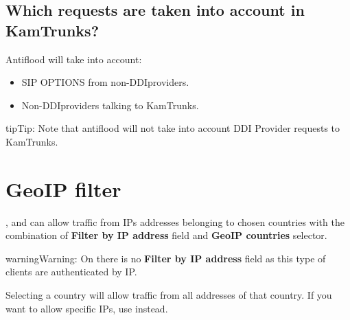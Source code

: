 \documentclass[letterpaper,10pt,english]{sphinxmanual}
\begin{document}
\subsection{Which requests are taken into account in KamTrunks?}
\label{security_and_maintenance/security/antiflooding:which-requests-are-taken-into-account-in-kamtrunks}
Antiflood will take into account:
\begin{itemize}
\item {} 
SIP OPTIONS from non-DDIproviders.

\item {} 
Non-DDIproviders talking to KamTrunks.

\end{itemize}

\begin{notice}{tip}{Tip:}
Note that antiflood will not take into account DDI Provider requests to KamTrunks.
\end{notice}


\section{GeoIP filter}
\label{security_and_maintenance/security/geoip_filter:geoip-filter}\label{security_and_maintenance/security/geoip_filter::doc}\label{security_and_maintenance/security/geoip_filter:id1}
{\hyperref[administration_portal/client/vpbx/index:vpbx\string-clients]{}}, {\hyperref[administration_portal/client/retail/index:retail\string-clients]{}} and {\hyperref[administration_portal/client/residential/index:residential\string-clients]{}} can allow traffic from
IPs addresses belonging to chosen countries with the combination of \textbf{Filter by IP address} field and \textbf{GeoIP countries} selector.

\begin{notice}{warning}{Warning:}
On {\hyperref[administration_portal/client/wholesale/index:wholesale\string-clients]{}} there is no \textbf{Filter by IP address} field as this type of clients are authenticated by IP.
\end{notice}

Selecting a country will allow traffic from all addresses of that country. If you want to allow specific IPs, use
{\hyperref[security_and_maintenance/security/authorized_ip_ranges:client\string-authorized\string-ip\string-ranges]{}} instead.
\end{document}
